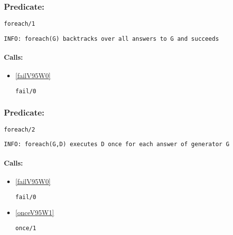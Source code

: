 \subsubsection{Predicate:} \label{foreachV95W1}

\begin{verbatim}
foreach/1
\end{verbatim}

{\small \begin{verbatim}
INFO: foreach(G) backtracks over all answers to G and succeeds

\end{verbatim}}
\paragraph{Calls:} 
\begin{itemize}
\item \ref{failV95W0} 
\begin{verbatim}
fail/0
\end{verbatim}

\end{itemize}

\subsubsection{Predicate:} \label{foreachV95W2}

\begin{verbatim}
foreach/2
\end{verbatim}

{\small \begin{verbatim}
INFO: foreach(G,D) executes D once for each answer of generator G

\end{verbatim}}
\paragraph{Calls:} 
\begin{itemize}
\item \ref{failV95W0} 
\begin{verbatim}
fail/0
\end{verbatim}

\item \ref{onceV95W1} 
\begin{verbatim}
once/1
\end{verbatim}

\end{itemize}
